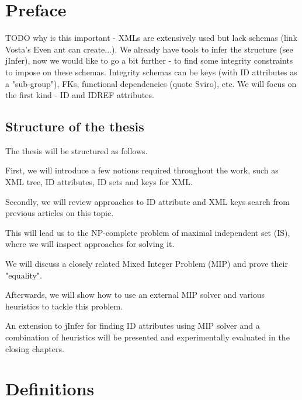 \documentclass[a4paper,12pt,oneside]{report}
\let\openright=\clearpage
\def\chapwithtoc#1{
\chapter*{#1}
\addcontentsline{toc}{chapter}{#1}
}
\begin{document}
\newpage


\openright
\pagestyle{plain}
\setcounter{page}{1}
\tableofcontents

\newpage


\chapwithtoc{Preface}

TODO why is this important - XMLs are extensively used but lack schemas (link Vosta's Even ant can create...).
We already have tools to infer the structure (see jInfer), now we would like to go a bit further - to find some integrity constraints to impose on these schemas.
Integrity schemas can be keys (with ID attributes as a "sub-group"), FKs, functional dependencies (quote Sviro), etc.
We will focus on the first kind - ID and IDREF attributes.

\section{Structure of the thesis}

The thesis will be structured as follows. 

First, we will introduce a few notions required throughout the work, such as XML tree, ID attributes, ID sets and keys for XML. 

Secondly, we will review approaches to ID attribute and XML keys search from previous articles on this topic. 

This will lead us to the NP-complete problem of maximal independent set (IS), where we will inspect approaches for solving it.

We will discuss a closely related Mixed Integer Problem (MIP) and prove their "equality".

Afterwards, we will show how to use an external MIP solver and various heuristics to tackle this problem.

An extension to jInfer for finding ID attributes using MIP solver and a combination of heuristics will be presented and experimentally evaluated in the closing chapters.

\chapter{Definitions}
\end{document}
